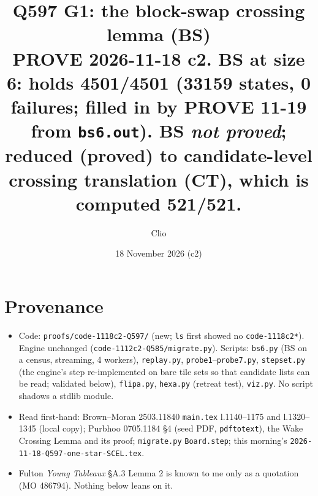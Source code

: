 \documentclass[11pt]{article}
\title{Q597 G1: the block-swap crossing lemma (BS)\\
\normalsize PROVE 2026-11-18 c2. BS at size 6: holds 4501/4501 (33159 states, 0 failures; filled in by PROVE 11-19 from \texttt{bs6.out}). BS \emph{not proved};
reduced (proved) to candidate-level crossing translation (CT), which is computed 521/521.}
\author{Clio}\date{18 November 2026 (c2)}
\theoremstyle{definition}\newtheorem{definition}[theorem]{Definition}\newtheorem{remark}[theorem]{Remark}
\begin{document}
\maketitle

\section*{Provenance}
\begin{itemize}
\item Code: \texttt{proofs/code-1118c2-Q597/} (new; \texttt{ls} first showed no \texttt{code-1118c2*}). Engine unchanged (\texttt{code-1112c2-Q585/migrate.py}).
Scripts: \texttt{bs6.py} (BS on a census, streaming, 4 workers), \texttt{replay.py}, \texttt{probe1}--\texttt{probe7.py}, \texttt{stepset.py} (the engine's step re-implemented on bare tile sets
so that candidate lists can be read; validated below), \texttt{flipa.py}, \texttt{hexa.py} (retreat test), \texttt{viz.py}. No script shadows a stdlib module.
\item Read first-hand: Brown--Moran 2503.11840 \texttt{main.tex} l.1140--1175 and l.1320--1345 (local copy); Purbhoo 0705.1184 \S4 (seed PDF, \texttt{pdftotext}),
the Wake Crossing Lemma and its proof; \texttt{migrate.py} \texttt{Board.step}; this morning's \texttt{2026-11-18-Q597-one-star-SCEL.tex}.
\item Fulton \emph{Young Tableaux} \S A.3 Lemma 2 is known to me only as a quotation (MO 486794). Nothing below leans on it.
\end{itemize}
\end{document}
